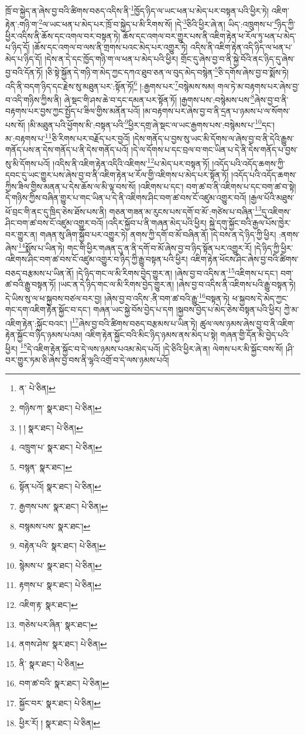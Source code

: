 ཁྲོ་བ་སྐྱེད་ན་ཞེས་བྱ་བའི་ཚིགས་བཅད་འདིས་ནི་\footnote{ན་  པེ་ཅིན། }ཁྱོད་ཉིད་ལ་ཡང་ཕན་པ་མེད་པར་བསྟན་པའི་ཕྱིར་ཏེ། འཇིག་རྟེན་:གཉི་ག་\footnote{གཉིས་ཀ་  སྣར་ཐང་།  པེ་ཅིན། }ལ་ཡང་ཕན་པ་མེད་པར་ཁྲོ་བ་སྐྱེད་པ་མི་རིགས་སོ། །དེ་\footnote{། །  སྣར་ཐང་།  པེ་ཅིན། }ཅིའི་ཕྱིར་ཞེ་ན། ཡིད་:འཁྲུགས་པ་\footnote{འཁྲུག་པ་  སྣར་ཐང་།  པེ་ཅིན། }ཉིད་ཀྱི་ཕྱིར་འདིས་ནི་ཆོས་དང་འགལ་བར་བསྟན་ཏེ། ཆོས་དང་འགལ་བར་གྱུར་པས་ནི་འཇིག་རྟེན་ཕ་རོལ་ཏུ་ཕན་པ་མེད་པ་ཉིད་དོ། །ཆོས་དང་འགལ་བ་ལས་ནི་གྲགས་པའང་མེད་པར་འགྱུར་ཏེ། འདིས་ནི་འཇིག་རྟེན་འདི་ཉིད་ལ་ཕན་པ་མེད་པ་ཉིད་དོ། །དེས་ན་དེ་དང་ཁྱོད་གཉི་ག་ལ་ཕན་པ་མེད་པའི་ཕྱིར། གྲོང་དུ་ཞེས་བྱ་བ་ནི་སྐྱེ་བོའི་ནང་ཉིད་དུ་ཞེས་བྱ་བའི་དོན་ཏོ། །ཅི་སྟེ་སྐྱོན་དེ་གཉི་ག་མེད་ཀྱང་དཀའ་ཐུབ་ཅན་ལ་བུད་མེད་བསྙེན་\footnote{བསྙན་  སྣར་ཐང་། }ཅི་དགོས་ཞེས་བྱ་བ་སྨོས་ཏེ། འདི་ནི་བདག་ཉིད་དང་རྗེས་སུ་མཐུན་པར་:སྟོན་ཏོ།\footnote{སྟོན་པའོ།  སྣར་ཐང་།  པེ་ཅིན། } །:རྒྱགས་པར་\footnote{རྒྱགས་པས་  སྣར་ཐང་།  པེ་ཅིན། }བསྙེམས་སམ། གལ་ཏེ་མ་བརྟགས་པར་ཞེས་བྱ་བ་འདི་གཉིས་ཀྱིས་ནི། ཞེ་སྡང་གི་ཤས་ཆེ་བ་དང་དམན་པར་སྟོན་ཏོ། །རྒྱགས་པས་:བསྙེམས་པས་\footnote{བསྙམས་པས་  སྣར་ཐང་། }ཞེས་བྱ་བ་ནི་བརྟགས་པར་བྱས་ཀྱང་སྤྱོད་པ་ཟིལ་གྱིས་མནོན་པའོ། །མ་བརྟགས་པར་ཞེས་བྱ་བ་ནི་དྲན་པ་ཉམས་པ་ལ་སོགས་པས་སོ། །མི་མཐུན་པའི་ཕྱོགས་མི་:བསྟན་པའི་\footnote{བརྟེན་པའི་  སྣར་ཐང་།  པེ་ཅིན། }ཕྱིར་དགྲ་ཞེ་སྡང་ལ་ཡང་རྒྱགས་པས་:བསྙེམས་པ་\footnote{སྙེམས་པ་  སྣར་ཐང་།  པེ་ཅིན། }དང་། མ་:བརྟགས་པ་\footnote{རྟགས་པ་  སྣར་ཐང་།  པེ་ཅིན། }ཅི་རིགས་པར་བརྗོད་པར་བྱའོ། །དེས་གནོད་པ་བྱས་སུ་ཡང་མི་དོགས་ལ་ཞེས་བྱ་བ་ནི་དེའི་རྒྱུས་གནོད་པས་ན་དེས་གནོད་པ་ནི་དེས་གནོད་པའོ། །དེ་ལ་དོགས་པ་དང་བྲལ་བ་གང་ཡིན་པ་དེ་ནི་དེས་གནོད་པ་བྱས་སུ་མི་དོགས་པའོ། །འདིས་ནི་འཇིག་རྟེན་འདིའི་འཇིགས་\footnote{འཇིག་རྟ་  སྣར་ཐང་། }པ་མེད་པར་བསྟན་ཏོ། །འདོད་པའི་འདོད་ཆགས་ཀྱི་དབང་དུ་ཡང་གྱུར་པས་ཞེས་བྱ་བ་ནི་འཇིག་རྟེན་ཕ་རོལ་གྱི་འཇིགས་པ་མེད་པར་སྟོན་ཏོ། །འདོད་པའི་འདོད་ཆགས་ཀྱིས་ཟིལ་གྱིས་མནན་པ་དེས་ཆོས་ལ་མི་ལྟ་བས་སོ། །འཇིགས་པ་དང་། བག་ཚ་བ་ནི་འཇིགས་པ་དང་བག་ཚ་བ་སྟེ། དེ་གཉིས་ཀྱིས་བཞིན་གྱུར་པ་གང་ཡིན་པ་དེ་ནི་འཇིགས་ཤིང་བག་ཚ་བས་ངོ་འཛུམ་འགྱུར་བའོ། །རྒྱལ་པོའི་མཐུས་ཕོ་བྲང་གི་ནང་དུ་ཁྲིད་ཅེས་ཐོས་པས་ནི། གཅན་གཟན་མ་རུངས་པས་དགོ་བ་མོ་:གཙེས་པ་བཞིན་\footnote{གཅེས་པར་ཞིན་  སྣར་ཐང་། }དུ་འཇིགས་ཤིང་བག་ཚ་བས་ངོ་འཛུམ་འགྱུར་བའོ། །འདིར་སྐྱོབ་པ་ནི་གཞན་མེད་པའི་ཕྱིར། སྐྱེ་དགུ་སྐྱོང་བའི་རྒྱལ་པོས་ཁྱེར་བར་གྱུར་ན། གཞན་སུ་ཞིག་སྐྱོབ་པར་འགྱུར་ཏེ། ནགས་ཀྱི་དགོ་བ་མོ་བཞིན་ནོ། །དེ་བས་ན་དེ་ཉིད་ཀྱི་ཕྱིར། :ནགས་ཞེས་\footnote{ནགས་ཤེས་  སྣར་ཐང་།  པེ་ཅིན། }སྨོས་པ་ཡིན་ཏེ། གང་གི་ཕྱིར་གཞན་དུ་ན་ནི་དགོ་བ་མོ་ཞེས་བྱ་བ་ཉིད་སྟོན་པར་འགྱུར་རོ། །དེ་ཉིད་ཀྱི་ཕྱིར་འཇིགས་ཤིང་བག་ཚ་བས་ངོ་འཛུམ་འགྱུར་བ་ཉིད་ཀྱི་རྒྱུ་བསྟན་པའི་ཕྱིར། འཇིག་རྟེན་ཕོངས་ཤིང་ཞེས་བྱ་བའི་ཚིགས་བཅད་བརྩམས་པ་ཡིན་ནོ། །དེ་ཉིད་གང་ལ་མི་རིགས་བྱེད་གྱུར་ན། །ཞེས་བྱ་བ་འདིས་ན་\footnote{ནི་  སྣར་ཐང་།  པེ་ཅིན། }འཇིགས་པ་དང་། བག་ཚ་བའི་རྒྱུ་བསྟན་ཏོ། །ཡང་ན་དེ་ཉིད་གང་ལ་མི་རིགས་བྱེད་གྱུར་ན། །ཞེས་བྱ་བ་འདིས་ནི་འཇིགས་པའི་རྒྱུ་བསྟན་ཏེ། དེ་ཡིས་སུ་ལ་ཕ་སྐྱབས་བཙལ་བར་བྱ། །ཞེས་བྱ་བ་འདིས་:ནི་བག་ཚ་བའི་རྒྱུ་\footnote{བག་ཚ་བའི་  སྣར་ཐང་།  པེ་ཅིན། }བསྟན་ཏེ། ཕ་སྐྱབས་དེ་མེད་ཀྱང་གང་དག་འཇིག་རྟེན་སྐྱོང་བ་དང་། གཞན་ཡང་སྐྱེ་བོས་བྱེད་པ་དག །སྐྱབས་བྱེད་པ་མེད་ཅེས་བསྟན་པའི་ཕྱིར། ཀྱེ་མ་འཇིག་རྟེན་:སྐྱོང་བའང་། །\footnote{སྐྱོང་བར་  སྣར་ཐང་།  པེ་ཅིན། }ཞེས་བྱ་བའི་ཚིགས་བཅད་བརྩམས་པ་ཡིན་ཏེ། ཚུལ་ལས་ཉམས་ཞེས་བྱ་བ་ནི་འཇིག་རྟེན་སྐྱོང་བ་ཉིད་ཉམས་པའམ། འཇིག་རྟེན་སྐྱོང་བའི་མིང་ཉིད་ཉམས་ནས་མེད་པ་སྟེ། གཞན་གྱི་དོན་མི་བྱེད་པའི་ཕྱིར། \footnote{ཕྱིར་རོ། །   སྣར་ཐང་།  པེ་ཅིན། }དེ་འཇིག་རྟེན་སྐྱོང་བ་དེ་ལས་ཉམས་པའམ་མེད་པའོ། །དེ་ཅིའི་ཕྱིར་ཞེ་ན། ལེགས་པར་མི་སྐྱོང་བས་སོ། །ཤི་བར་གྱུར་ཏམ་ཅི་ཞེས་བྱ་བས་ནི་ལྷའི་འགྲོ་བ་དེ་ལས་ཉམས་པའོ། 